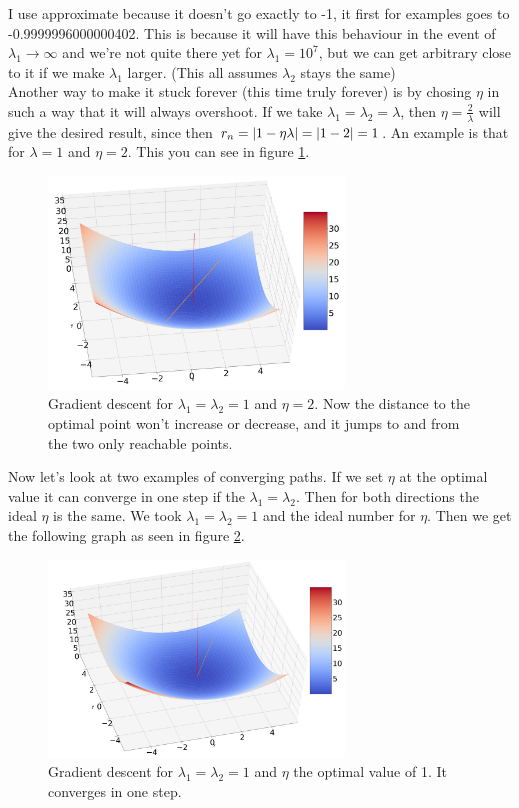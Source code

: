 \documentclass[a4paper]{article}
\begin{document}
I use approximate because it doesn't go exactly to -1, it first for examples goes to -0.9999996000000402. This is because it will have this behaviour in the event of $\lambda_1 \rightarrow \infty$ and we're not quite there yet for $\lambda_1 = 10^7$, but we can get arbitrary close to it if we make $\lambda_1$ larger. (This all assumes $\lambda_2$ stays the same)
\\

Another way to make it stuck forever (this time truly forever) is by chosing $\eta$ in such a way that it will always overshoot. If we take $\lambda_1 = \lambda_2 = \lambda$, then $\eta = \frac{2}{\lambda}$ will give the desired result, since then $r_n = \abs{1-\eta \lambda} = \abs{1 - 2} = 1$. An example is that for $\lambda = 1$ and $\eta = 2$. This you can see in figure \ref{NonConLamb}.

\begin{figure}[H]
\includegraphics[width=0.7\textwidth]{Images/NonConLamb.png}
\caption{Gradient descent for $\lambda_1=\lambda_2 = 1$ and $\eta = 2$. Now the distance to the optimal point won't increase or decrease, and it jumps to and from the two only reachable points. }
\label{NonConLamb}
\end{figure}


\newpage

Now let's look at two examples of converging paths. If we set $\eta$ at the optimal value it can converge in one step if the $\lambda_1=\lambda_2$. Then for both directions the ideal $\eta$ is the same. We took $\lambda_1=\lambda_2 = 1$ and the ideal number for $\eta$. Then we get the following graph as seen in figure \ref{Ideal}.

\begin{figure}[H]
\includegraphics[width=0.7\textwidth]{Images/ConvOnce.png}
\caption{Gradient descent for $\lambda_1=\lambda_2=1$ and $\eta$ the optimal value of 1. It converges in one step.}
\label{Ideal}
\end{figure}
\end{document}
